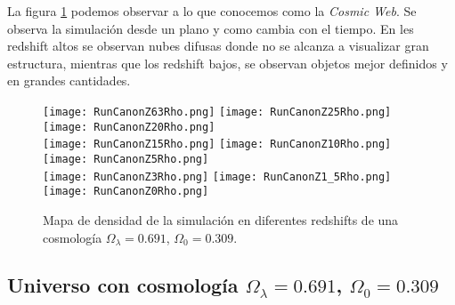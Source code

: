 La figura \ref{fig:CanonRunDensityMap} podemos observar a lo que conocemos como la \emph{Cosmic Web}. Se observa la simulación desde un plano y como cambia con el tiempo. En les redshift altos se observan nubes difusas donde no se alcanza a visualizar gran estructura, mientras que los redshift bajos, se observan objetos mejor definidos y en grandes cantidades.
\begin{figure}
    \centering

    \texttt{[image: RunCanonZ63Rho.png]}   %
    \texttt{[image: RunCanonZ25Rho.png]}   %
    \texttt{[image: RunCanonZ20Rho.png]}   %
    \\
    \texttt{[image: RunCanonZ15Rho.png]}   %
    \texttt{[image: RunCanonZ10Rho.png]}   %
    \texttt{[image: RunCanonZ5Rho.png]}    %
    \\
    \texttt{[image: RunCanonZ3Rho.png]}    %
    \texttt{[image: RunCanonZ1\_5Rho.png]}  %
    \texttt{[image: RunCanonZ0Rho.png]}    %
    \caption[Mapa de densidad de un Universo $\Omega_\lambda = 0.691 $, $\Omega_0 = 0.309$ en en diferentes redshift]{ \small Mapa de densidad de la simulación en diferentes redshifts de una cosmología $\Omega_\lambda = 0.691 $, $\Omega_0 = 0.309$. }
    \label{fig:CanonRunDensityMap}
\end{figure}







\subsection{ Universo con cosmología  \texorpdfstring{$\Omega_\lambda = 0.691$, $\Omega_0 = 0.309$ }{Omega lambda = 0.691, Omega 0 = 0.309} }


